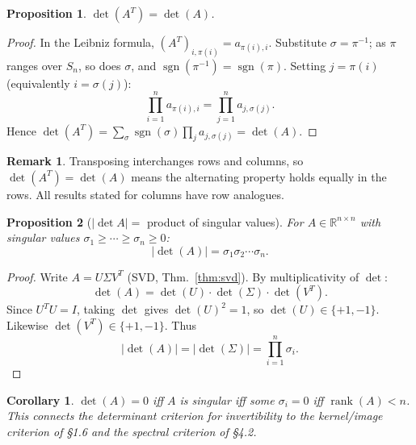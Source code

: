 \documentclass[11pt]{article}
\theoremstyle{definition}
\newtheorem{remark}{Remark}[section]
\theoremstyle{plain}
\newtheorem{proposition}{Proposition}[section]
\newtheorem{corollary}{Corollary}[section]
\begin{document}
\begin{proposition}
  $\det(A^T) = \det(A)$.
\end{proposition}
\begin{proof}
  In the Leibniz formula, $(A^T)_{i,\pi(i)} = a_{\pi(i),i}$.
  Substitute $\sigma = \pi^{-1}$; as $\pi$ ranges over $S_n$, so does
  $\sigma$, and $\operatorname{sgn}(\pi^{-1})=\operatorname{sgn}(\pi)$.
  Setting $j=\pi(i)$ (equivalently $i=\sigma(j)$):
  \[
    \prod_{i=1}^n a_{\pi(i),i}
    = \prod_{j=1}^n a_{j,\sigma(j)}.
  \]
  Hence $\det(A^T)
  = \sum_\sigma \operatorname{sgn}(\sigma)\prod_j a_{j,\sigma(j)}
  = \det(A)$.
\end{proof}

\begin{remark}
  Transposing interchanges rows and columns, so $\det(A^T)=\det(A)$
  means the alternating property holds equally in the rows.  All results
  stated for columns have row analogues.
\end{remark}

\begin{proposition}[$|\det A| = $ product of singular values]
\label{prop:det-svd}
  For $A\in\mathbb{R}^{n\times n}$ with singular values
  $\sigma_1\ge\cdots\ge\sigma_n\ge 0$:
  \[
    |\det(A)| = \sigma_1\sigma_2\cdots\sigma_n.
  \]
\end{proposition}
\begin{proof}
  Write $A = U\Sigma V^T$ (SVD, Thm.~\ref{thm:svd}).
  By multiplicativity of $\det$:
  \[
    \det(A) = \det(U)\cdot\det(\Sigma)\cdot\det(V^T).
  \]
  Since $U^TU = I$, taking $\det$ gives $\det(U)^2=1$, so
  $\det(U)\in\{+1,-1\}$.  Likewise $\det(V^T)\in\{+1,-1\}$.
  Thus
  \[
    |\det(A)| = |\det(\Sigma)| = \prod_{i=1}^n\sigma_i.
  \]
\end{proof}

\begin{corollary}
  $\det(A)=0$ iff $A$ is singular iff some $\sigma_i=0$
  iff $\operatorname{rank}(A)<n$.
  This connects the determinant criterion for invertibility to the
  kernel/image criterion of \S1.6 and the spectral criterion of \S4.2.
\end{corollary}
\end{document}
